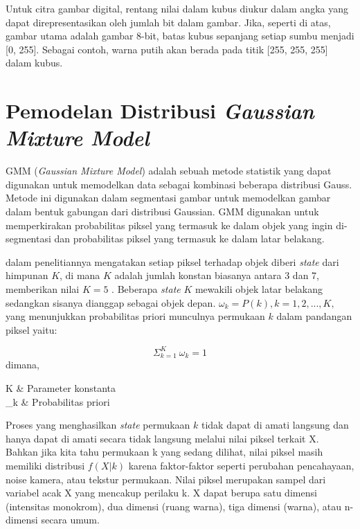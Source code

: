 Untuk citra gambar digital, rentang nilai dalam kubus diukur dalam angka yang dapat 
direpresentasikan oleh jumlah bit dalam gambar. Jika, seperti di atas, gambar utama 
adalah gambar 8-bit, batas kubus sepanjang setiap sumbu menjadi [0, 255]. 
Sebagai contoh, warna putih akan berada pada titik [255, 255, 255] dalam kubus.

\section{Pemodelan Distribusi \emph{Gaussian Mixture Model}}

GMM (\emph{Gaussian Mixture Model}) adalah sebuah metode statistik yang dapat digunakan 
untuk memodelkan data sebagai kombinasi beberapa distribusi Gauss. Metode ini 
digunakan dalam segmentasi gambar untuk memodelkan gambar dalam bentuk gabungan 
dari distribusi Gaussian. GMM digunakan untuk memperkirakan probabilitas piksel 
yang termasuk ke dalam objek yang ingin di-segmentasi dan probabilitas piksel 
yang termasuk ke dalam latar belakang. 

\cite{Power:2002} dalam penelitiannya mengatakan setiap piksel terhadap objek diberi \emph{state} dari himpunan \(K\), di mana \(K\) 
adalah jumlah konstan biasanya antara 3 dan 7, \cite{Rother:2004} memberikan nilai \(K = 5\) . Beberapa \emph{state} \(K\) mewakili 
objek latar belakang sedangkan sisanya dianggap sebagai objek depan. \(\omega_k = P(k), k = 1,2,...,K,\) yang menunjukkan 
probabilitas priori munculnya permukaan \(k\) dalam pandangan piksel yaitu:

\begin{equation} \label{eq:prior_probability}
  \Sigma_{k=1}^{K} \: \omega_k = 1
\end{equation}
dimana, 

\begin{conditions}
  K & Parameter konstanta\\
  \omega_k & Probabilitas priori
\end{conditions}

Proses yang menghasilkan \emph{state} permukaan \(k\) tidak dapat di amati langsung dan hanya 
dapat di amati secara tidak langsung melalui nilai piksel terkait X. Bahkan jika 
kita tahu permukaan k yang sedang dilihat, nilai piksel masih memiliki distribusi 
\(f(X|k)\) karena faktor-faktor seperti perubahan pencahayaan, noise kamera, atau 
tekstur permukaan. Nilai piksel merupakan sampel dari variabel acak X yang mencakup 
perilaku k. X dapat berupa satu dimensi (intensitas monokrom), dua dimensi (ruang 
warna), tiga dimensi (warna), atau n-dimensi secara umum. 

